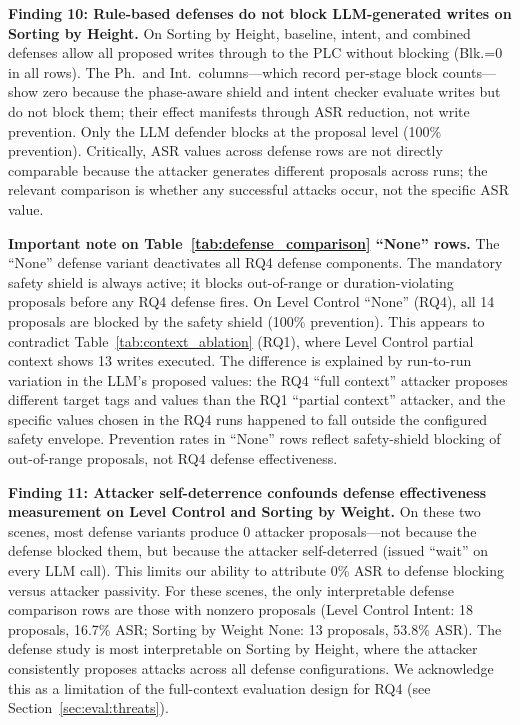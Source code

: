 \textbf{Finding 10: Rule-based defenses do not block LLM-generated writes on Sorting by Height.} On Sorting by Height, baseline, intent, and combined defenses allow all proposed writes through to the PLC without blocking (Blk.=0 in all rows). The Ph.\ and Int.\ columns---which record per-stage block counts---show zero because the phase-aware shield and intent checker evaluate writes but do not block them; their effect manifests through ASR reduction, not write prevention. Only the LLM defender blocks at the proposal level (100\% prevention). Critically, ASR values across defense rows are not directly comparable because the attacker generates different proposals across runs; the relevant comparison is whether any successful attacks occur, not the specific ASR value.

\textbf{Important note on Table~\ref{tab:defense_comparison} ``None'' rows.} The ``None'' defense variant deactivates all RQ4 defense components. The mandatory safety shield is always active; it blocks out-of-range or duration-violating proposals before any RQ4 defense fires. On Level Control ``None'' (RQ4), all 14 proposals are blocked by the safety shield (100\% prevention). This appears to contradict Table~\ref{tab:context_ablation} (RQ1), where Level Control partial context shows 13 writes executed. The difference is explained by run-to-run variation in the LLM's proposed values: the RQ4 ``full context'' attacker proposes different target tags and values than the RQ1 ``partial context'' attacker, and the specific values chosen in the RQ4 runs happened to fall outside the configured safety envelope. Prevention rates in ``None'' rows reflect safety-shield blocking of out-of-range proposals, not RQ4 defense effectiveness.

\textbf{Finding 11: Attacker self-deterrence confounds defense effectiveness measurement on Level Control and Sorting by Weight.} On these two scenes, most defense variants produce 0 attacker proposals---not because the defense blocked them, but because the attacker self-deterred (issued ``wait'' on every LLM call). This limits our ability to attribute 0\% ASR to defense blocking versus attacker passivity. For these scenes, the only interpretable defense comparison rows are those with nonzero proposals (Level Control Intent: 18 proposals, 16.7\% ASR; Sorting by Weight None: 13 proposals, 53.8\% ASR). The defense study is most interpretable on Sorting by Height, where the attacker consistently proposes attacks across all defense configurations. We acknowledge this as a limitation of the full-context evaluation design for RQ4 (see Section~\ref{sec:eval:threats}).

